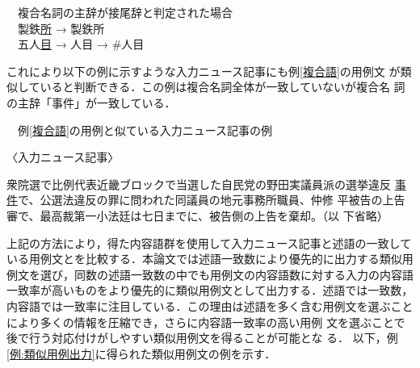 \documentclass[japanese]{jnlp_1.4}
\newcounter{exp}
\def\exp#1{}
\begin{document}
\begin{screen}
\exp{syuzi}　複合名詞の主辞が接尾辞と判定された場合 \\
　製鉄\ul{所}  →  製鉄所\\
　五人\ul{目}    →  人目  →  \#人目
\end{screen}

\noindent
これにより以下の例に示すような入力ニュース記事にも例\ref{複合語}の用例文
が類似していると判断できる．この例は複合名詞全体が一致していないが複合名
詞の主辞「事件」が一致している．

\begin{screen}
\exp{nolabel02}　例\ref{複合語}の用例と似ている入力ニュース記事の例

〈入力ニュース記事〉

{\setlength{\leftskip}{2zw}
衆院選で比例代表近畿ブロックで当選した自民党の野田実議員派の選挙違反
\ul{事件}で、公選法違反の罪に問われた同議員の地元事務所職員、仲修
平被告の上告審で、最高裁第一小法廷は七日までに、被告側の上告を棄却。（以
下省略）
\par}
\end{screen}

上記の方法により，得た内容語群を使用して入力ニュース記事と述語の一致して
いる用例文とを比較する．本論文では述語一致数により優先的に出力する類似用
例文を選び，同数の述語一致数の中でも用例文の内容語数に対する入力の内容語
一致率が高いものをより優先的に類似用例文として出力する．述語では一致数，
内容語では一致率に注目している．この理由は述語を多く含む用例文を選ぶこと
により多くの情報を圧縮でき，さらに内容語一致率の高い用例
文を選ぶことで後で行う対応付けがしやすい類似用例文を得ることが可能とな
る． 以下，例\ref{例:類似用例出力}に得られた類似用例文の例を示す．
\end{document}
